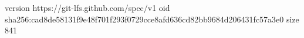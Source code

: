 version https://git-lfs.github.com/spec/v1
oid sha256:cad8de58131f9e48f701f293f0729cce8afd636cd82bb9684d206431fc57a3e0
size 841
